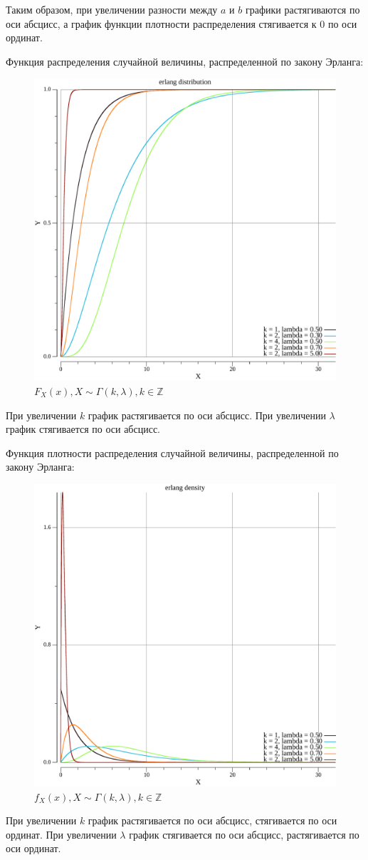 Таким образом, при увеличении разности между $a$ и $b$ графики растягиваются по оси абсцисс, а график функции плотности распределения стягивается к 0 по оси ординат.

\newpage

Функция распределения случайной величины, распределенной по закону Эрланга:

\begin{figure}[H]
    \begin{center}
    \includegraphics[width=0.7\linewidth]{inc/all_dist_erl.pdf}
    \caption{$F_X(x), X \sim \Gamma(k, \lambda), k \in \mathbb {Z}$}
    \label{fig:}
    \end{center}
\end{figure}

При увеличении $k$ график растягивается по оси абсцисс. При увеличении $\lambda$ график стягивается по оси абсцисс.

\newpage

Функция плотности распределения случайной величины, распределенной по закону Эрланга:

\begin{figure}[H]
    \begin{center}
    \includegraphics[width=0.7\linewidth]{inc/all_dens_erl.pdf}
    \caption{$f_X(x), X \sim \Gamma(k, \lambda), k \in \mathbb {Z}$}
    \label{fig:}
    \end{center}
\end{figure}

При увеличении $k$ график растягивается по оси абсцисс, стягивается по оси ординат. При увеличении $\lambda$ график стягивается по оси абсцисс, растягивается по оси ординат.

\newpage

